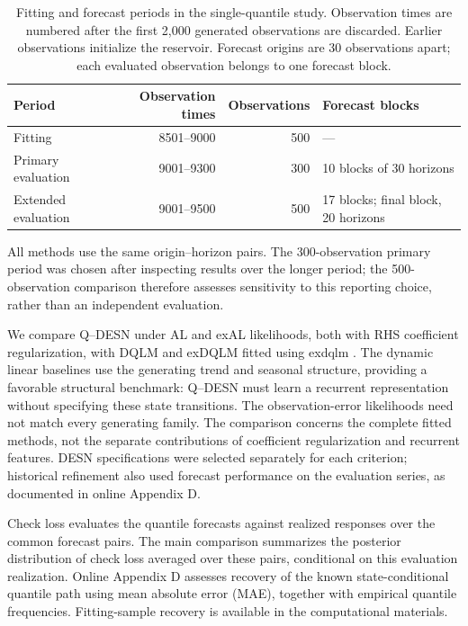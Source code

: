 \documentclass[12pt,letterpaper]{article}
\numberwithin{equation}{section}
\newcommand{\pkg}[1]{\textsf{#1}}
\begin{document}
\begin{table}[!htbp]
\centering
\small
\caption{Fitting and forecast periods in the single-quantile study.
Observation times are numbered after the first 2,000 generated observations
are discarded. Earlier observations initialize the reservoir. Forecast
origins are 30 observations apart; each evaluated observation belongs
to one forecast block.}
\label{tab:independent-sample-roles}
\begin{tabularx}{\textwidth}{@{}lrrY@{}}
\toprule
Period & Observation times & Observations & Forecast blocks \\
\midrule
Fitting & 8501--9000 & 500 & --- \\
Primary evaluation & 9001--9300 & 300 & 10 blocks of 30 horizons \\
Extended evaluation & 9001--9500 & 500 & 17 blocks; final block, 20 horizons \\
\bottomrule
\end{tabularx}
\end{table}

All methods use the same origin--horizon pairs. The 300-observation primary
period was chosen after inspecting results over the longer period; the
500-observation comparison therefore assesses sensitivity to this reporting
choice, rather than an independent evaluation.

We compare Q--DESN under AL and exAL likelihoods, both with RHS coefficient
regularization, with DQLM and exDQLM fitted using \pkg{exdqlm}
\citep{DeLeonEtAl2026Exdqlm}. The dynamic linear baselines use the generating
trend and seasonal structure, providing a favorable structural benchmark:
Q--DESN must learn a recurrent representation without specifying these state
transitions. The observation-error likelihoods need not match every
generating family. The comparison concerns the complete fitted methods,
not the separate contributions of coefficient regularization and recurrent
features. DESN specifications were selected separately for each criterion;
historical refinement also used forecast performance on the evaluation
series, as documented in online Appendix D.

Check loss evaluates the quantile forecasts against realized responses over
the common forecast pairs. The main comparison summarizes the posterior
distribution of check loss averaged over these pairs, conditional on this
evaluation realization. Online Appendix D assesses recovery of the known
state-conditional quantile path using mean absolute error (MAE), together
with empirical quantile frequencies. Fitting-sample recovery is available
in the computational materials.
\end{document}
